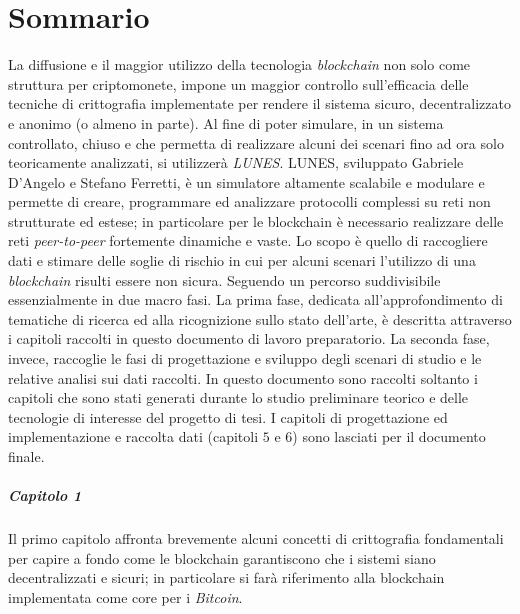 \chapter*{Sommario}
La diffusione e il maggior utilizzo della tecnologia \textit{blockchain} non solo come struttura per criptomonete, impone un maggior controllo sull'efficacia delle tecniche di crittografia implementate per rendere il sistema sicuro, decentralizzato e anonimo (o almeno in parte).\newline
Al fine di poter simulare, in un sistema controllato, chiuso e che permetta di realizzare alcuni dei scenari fino ad ora solo teoricamente analizzati, si utilizzerà \textit{LUNES}\cite{gdalunes}.\newline
LUNES, sviluppato Gabriele D'Angelo e Stefano Ferretti, è un simulatore altamente scalabile e modulare e permette di creare, programmare ed analizzare protocolli complessi su reti non strutturate ed estese; in particolare per le blockchain è necessario realizzare delle reti \textit{peer-to-peer} fortemente dinamiche e vaste.\newline
Lo scopo è quello di raccogliere dati e stimare delle soglie di rischio in cui per alcuni scenari l'utilizzo di una \textit{blockchain} risulti essere non sicura.\newline\newline
Seguendo un percorso suddivisibile essenzialmente in due macro fasi. La prima fase, dedicata all'approfondimento di tematiche di ricerca ed alla ricognizione sullo stato dell'arte, è descritta attraverso i capitoli raccolti in questo documento di lavoro preparatorio. La seconda fase, invece, raccoglie le fasi di progettazione e sviluppo degli scenari di studio e le relative analisi sui dati raccolti.\newline
In questo documento sono raccolti soltanto i capitoli che sono stati generati durante lo studio preliminare teorico e delle tecnologie di interesse del progetto di tesi. I capitoli di progettazione ed implementazione e raccolta dati (capitoli $5$ e $6$) sono lasciati per il documento finale.

\paragraph{Capitolo 1}
Il primo capitolo affronta brevemente alcuni concetti di crittografia fondamentali per capire a fondo come le blockchain garantiscono che i sistemi siano decentralizzati e sicuri; in particolare si farà riferimento alla blockchain implementata come core per i \textit{Bitcoin}.

